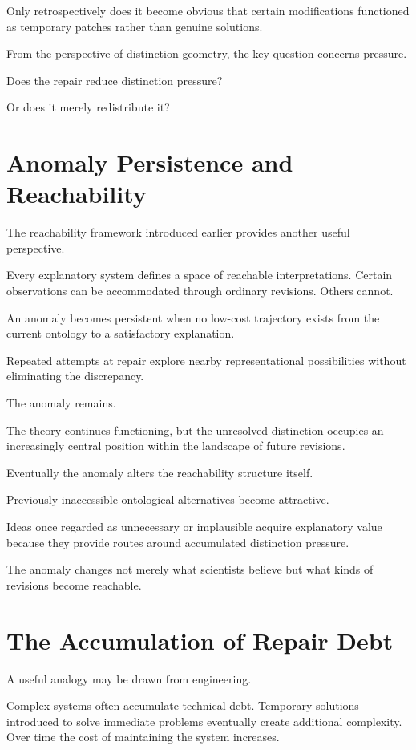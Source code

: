 \documentclass[11pt,oneside,openany]{book}
\begin{document}
Only retrospectively does it become obvious that certain modifications functioned as temporary patches rather than genuine solutions.

From the perspective of distinction geometry, the key question concerns pressure.

Does the repair reduce distinction pressure?

Or does it merely redistribute it?

\section{Anomaly Persistence and Reachability}

The reachability framework introduced earlier provides another useful perspective.

Every explanatory system defines a space of reachable interpretations. Certain observations can be accommodated through ordinary revisions. Others cannot.

An anomaly becomes persistent when no low-cost trajectory exists from the current ontology to a satisfactory explanation.

Repeated attempts at repair explore nearby representational possibilities without eliminating the discrepancy.

The anomaly remains.

The theory continues functioning, but the unresolved distinction occupies an increasingly central position within the landscape of future revisions.

Eventually the anomaly alters the reachability structure itself.

Previously inaccessible ontological alternatives become attractive.

Ideas once regarded as unnecessary or implausible acquire explanatory value because they provide routes around accumulated distinction pressure.

The anomaly changes not merely what scientists believe but what kinds of revisions become reachable.

\section{The Accumulation of Repair Debt}

A useful analogy may be drawn from engineering.

Complex systems often accumulate technical debt. Temporary solutions introduced to solve immediate problems eventually create additional complexity. Over time the cost of maintaining the system increases.
\end{document}
